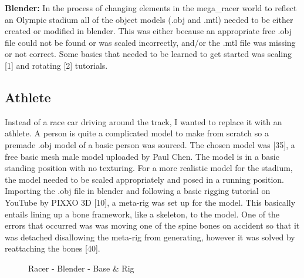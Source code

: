 \documentclass[a4 paper, 12pt]{article}
\begin{document}
\textbf{Blender:} In the process of changing elements in the mega\_racer world to reflect an Olympic stadium all of the object models (.obj and .mtl) needed to be either created or modified in blender. This was either because an appropriate free .obj file could not be found or was scaled incorrectly, and/or the .mtl file was missing or not correct. Some basics that needed to be learned to get started was scaling [1] and rotating [2] tutorials.

\subsection{Athlete}
Instead of a race car driving around the track, I wanted to replace it with an athlete. A person is quite a complicated model to make from scratch so a premade .obj model of a basic person was sourced. The chosen model was [35], a free basic mesh male model uploaded by Paul Chen. The model is in a basic standing position with no texturing. For a more realistic model for the stadium, the model needed to be scaled appropriately and posed in a running position. Importing the .obj file in blender and following a basic rigging tutorial on YouTube by PIXXO 3D [10], a meta-rig was set up for the model. This basically entails lining up a bone framework, like a skeleton, to the model. One of the errors that occurred was was moving one of the spine bones on accident so that it was detached disallowing the meta-rig from generating, however it was solved by reattaching the bones [40].
    \begin{figure} [H]
        \caption{Racer - Blender - Base \& Rig}   
    \end{figure}
\end{document}

